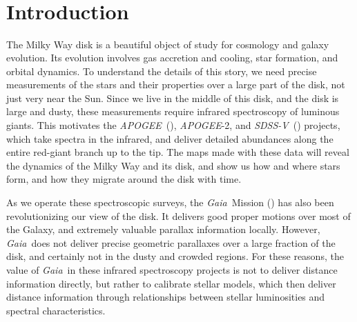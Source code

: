 \documentclass[modern]{aastex62}
\newcommand{\acronym}[1]{{\small{#1}}}
\newcommand{\project}[1]{\textsl{#1}}
\newcommand{\apogee}{\project{\acronym{APOGEE}}}
\newcommand{\gaia}{\project{Gaia}}
\newcommand{\sdssv}{\project{\acronym{SDSS-V}}}
\begin{document}

\section*{~}\clearpage
\section{Introduction}\label{sec:intro}

The Milky Way disk is a beautiful object of study for cosmology and galaxy evolution.
Its evolution involves gas accretion and cooling, star formation, and orbital dynamics.
To understand the details of this story, we need precise measurements of the
stars and their properties over a large part of the disk, not just
very near the Sun.
Since we live in the middle of this disk, and the disk is large and
dusty, these measurements require infrared spectroscopy of luminous
giants.
This motivates the \apogee\ (\citealt{apogee}),
\apogee-2, and \sdssv\ (\citealt{sdssv})
projects, which take spectra in the infrared, and deliver detailed abundances
along the entire red-giant branch up to the tip.
The maps made with these data will reveal the dynamics of the Milky Way and its disk,
and show us how and where stars form, and how they migrate around the
disk with time.

As we operate these spectroscopic surveys,
the \gaia\ Mission (\citealt{gaia}) has also been revolutionizing our view of the disk.
It delivers good proper motions over most of the Galaxy,
and extremely valuable parallax information locally.
However, \gaia\ does not deliver precise geometric parallaxes over a large fraction of
the disk, and certainly not in the dusty and crowded regions.
For these reasons, the value of \gaia\ in these infrared spectroscopy projects is not
to deliver distance information directly, but rather to calibrate stellar models,
which then deliver distance information through relationships between stellar
luminosities and spectral characteristics.
\end{document}
